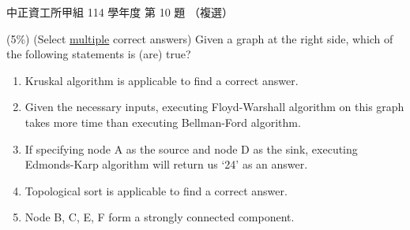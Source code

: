 \begin{pastexam}[label={px:ccu-114-swa-10}]{中正資工所甲組 114 學年度 第 10 題}
（複選）

(5\%) (Select \underline{multiple} correct answers) Given a graph at the right side, which of the
following statements is (are) true?

\begin{center}
\end{center}
\begin{enumerate}[label=(\alph*)]
\item Kruskal algorithm is applicable to find a correct answer.
\item Given the necessary inputs, executing Floyd-Warshall algorithm on this graph takes more time than
executing Bellman-Ford algorithm.
\item If specifying node A as the source and node D as the sink, executing Edmonds-Karp algorithm will
return us `24' as an answer.
\item Topological sort is applicable to find a correct answer.
\item Node B, C, E, F form a strongly connected component.
\end{enumerate}
\end{pastexam}

